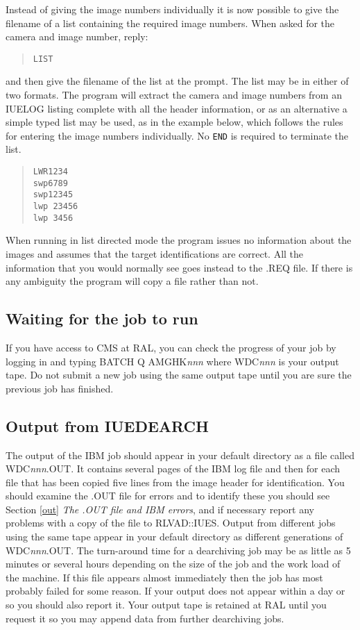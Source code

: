 Instead of giving the image numbers individually it is now possible to give
the filename of a list containing the required image numbers. When asked
for the camera and image number, reply:

\begin{quote}
{\tt LIST}
\end{quote}

and then give the filename of the list at the prompt.
The list may be in either of two formats. The program will extract the camera 
and image numbers from an IUELOG
listing complete with all the header information, or as an alternative 
a simple typed list may be used, as in the example below, which
follows the rules for entering the image numbers individually. No {\tt END}
is required to terminate the list.

\begin{quote}
\begin{verbatim}
LWR1234
swp6789
swp12345
lwp 23456
lwp 3456
\end{verbatim}
\end{quote}

When running
in list directed mode the program issues no information about the images and
assumes that the target identifications are correct. All the information that
you would normally see goes instead to the .REQ file.
If there is any ambiguity
the program will copy a file rather than not.

\subsection {Waiting for the job to run}

If you have access to CMS at RAL, you can check the progress of your job by
logging in and typing BATCH Q AMGHK{\it nnn} 
where WDC{\it nnn} is your output tape.
Do not submit a new job using the same output tape until you are sure the
previous job has finished.

\subsection {Output from IUEDEARCH}

The output of the IBM job should appear in your default directory as 
a file called WDC{\it nnn}.OUT.
It contains several pages of the IBM log file and then for each file that has
been copied five lines from the image header for identification. 
You should examine the .OUT file for errors and to identify these you should
see Section \ref{out} {\it The .OUT file and IBM errors},
and if necessary report
any problems with a copy of the file to RLVAD::IUES.
Output from different jobs using the same tape appear in your default directory
as different generations of WDC{\it nnn}.OUT.
The turn-around time for a dearchiving job may be as little as 5 minutes or
several hours depending on the size of the job and the work load of the machine.
If this file appears almost immediately then the job has most probably
failed for some reason.
If your output does not appear within a day or so you should also report it.
Your output tape is retained at RAL until you request it 
so you may append data from further
dearchiving jobs. 

